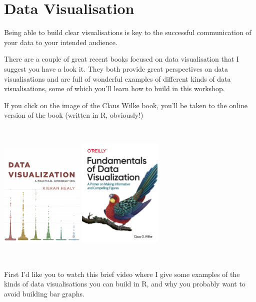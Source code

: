 \documentclass[
]{book}
\begin{document}
\hypertarget{data-visualisation}{%
\chapter{Data Visualisation}\label{data-visualisation}}

Being able to build clear visualisations is key to the successful communication of your data to your intended audience.

There are a couple of great recent books focused on data visualisation that I suggest you have a look it. They both provide great perspectives on data visualisations and are full of wonderful examples of different kinds of data visualisations, some of which you'll learn how to build in this workshop.

If you click on the image of the Claus Wilke book, you'll be taken to the online version of the book (written in R, obviously!)

~~

\href{https://socviz.co}{\includegraphics[width=0.3\textwidth,height=\textheight]{images/healey.jpg}} \href{https://serialmentor.com/dataviz/}{\includegraphics[width=0.3\textwidth,height=\textheight]{images/wilke.png}}

~~

First I'd like you to watch this brief video where I give some examples of the kinds of data visualisations you can build in R, and why you probably want to avoid building bar graphs.

~~
\end{document}
